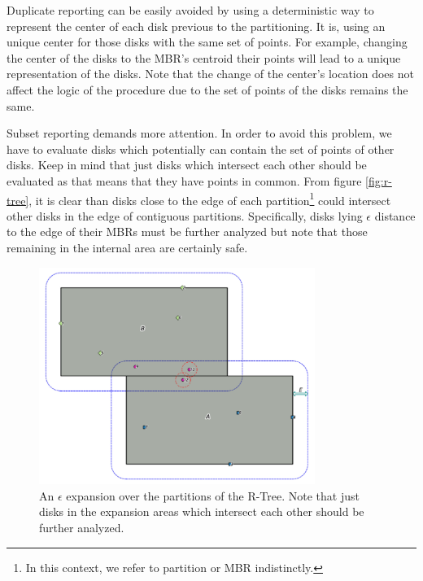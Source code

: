 \documentclass[12pt]{scrartcl}
\begin{document}
Duplicate reporting can be easily avoided by using a deterministic way to represent the center of each disk previous to the partitioning.  It is, using an unique center for those disks with the same set of points.  For example, changing the center of the disks to the MBR's centroid their points will lead to a unique representation of the disks.  Note that the change of the center's location does not affect the logic of the procedure due to the set of points of the disks remains the same.

Subset reporting demands more attention.  In order to avoid this problem, we have to evaluate disks which potentially can contain the set of points of other disks.  Keep in mind that just disks which intersect each other should be evaluated as that means that they have points in common. From figure \ref{fig:r-tree}, it is clear than disks close to the edge of each partition\footnote{In this context, we refer to partition or MBR indistinctly.} could intersect other disks in the edge of contiguous partitions. Specifically, disks lying $\epsilon$ distance to the edge of their MBRs must be further analyzed but note that those remaining in the internal area are certainly safe. 

\begin{figure}
	\centering
	\begin{center}
	\includegraphics[width=0.8\textwidth]{./Figures/expansion}
\end{center}
	\caption{An $\epsilon$ expansion over the partitions of the R-Tree. Note that just disks in the expansion areas which intersect each other should be further analyzed. }
	\label{fig:expansion}
\end{figure}
\end{document}
